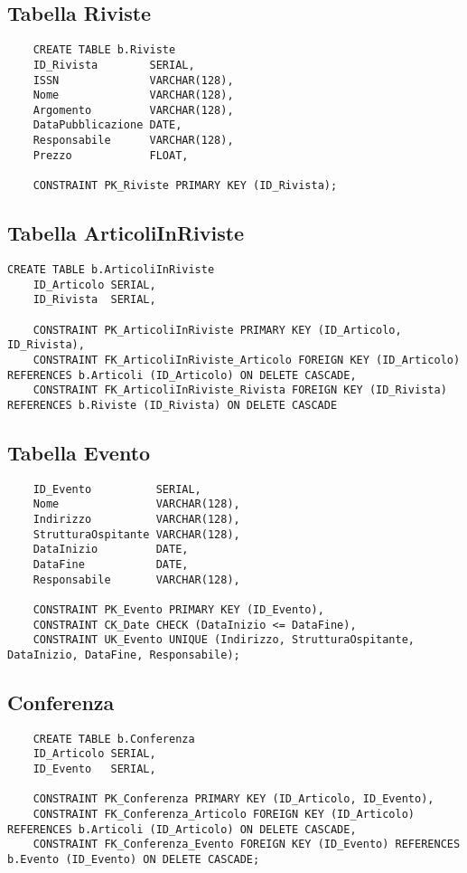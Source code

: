 \subsection{Tabella Riviste}
\begin{lstlisting}
    CREATE TABLE b.Riviste
    ID_Rivista        SERIAL,
    ISSN              VARCHAR(128),
    Nome              VARCHAR(128),
    Argomento         VARCHAR(128),
    DataPubblicazione DATE,
    Responsabile      VARCHAR(128),
    Prezzo            FLOAT,

    CONSTRAINT PK_Riviste PRIMARY KEY (ID_Rivista);
\end{lstlisting}

\subsection{Tabella ArticoliInRiviste}
\begin{lstlisting}
CREATE TABLE b.ArticoliInRiviste
    ID_Articolo SERIAL,
    ID_Rivista  SERIAL,

    CONSTRAINT PK_ArticoliInRiviste PRIMARY KEY (ID_Articolo, ID_Rivista),
    CONSTRAINT FK_ArticoliInRiviste_Articolo FOREIGN KEY (ID_Articolo) REFERENCES b.Articoli (ID_Articolo) ON DELETE CASCADE,
    CONSTRAINT FK_ArticoliInRiviste_Rivista FOREIGN KEY (ID_Rivista) REFERENCES b.Riviste (ID_Rivista) ON DELETE CASCADE
\end{lstlisting}

\newpage

\subsection{Tabella Evento}
\begin{lstlisting}
    ID_Evento          SERIAL,
    Nome               VARCHAR(128),
    Indirizzo          VARCHAR(128),
    StrutturaOspitante VARCHAR(128),
    DataInizio         DATE,
    DataFine           DATE,
    Responsabile       VARCHAR(128),

    CONSTRAINT PK_Evento PRIMARY KEY (ID_Evento),
    CONSTRAINT CK_Date CHECK (DataInizio <= DataFine),
    CONSTRAINT UK_Evento UNIQUE (Indirizzo, StrutturaOspitante, DataInizio, DataFine, Responsabile);
\end{lstlisting}

\subsection{Conferenza}
\begin{lstlisting}
    CREATE TABLE b.Conferenza
    ID_Articolo SERIAL,
    ID_Evento   SERIAL,

    CONSTRAINT PK_Conferenza PRIMARY KEY (ID_Articolo, ID_Evento),
    CONSTRAINT FK_Conferenza_Articolo FOREIGN KEY (ID_Articolo) REFERENCES b.Articoli (ID_Articolo) ON DELETE CASCADE,
    CONSTRAINT FK_Conferenza_Evento FOREIGN KEY (ID_Evento) REFERENCES b.Evento (ID_Evento) ON DELETE CASCADE;
\end{lstlisting}

